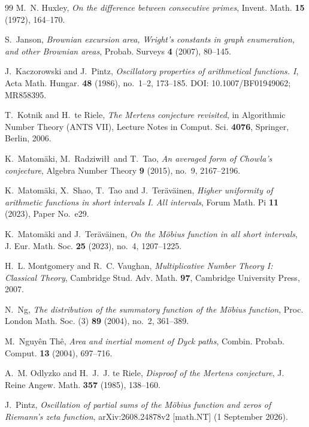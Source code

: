 \documentclass[11pt]{amsart}
\numberwithin{equation}{section}
\theoremstyle{plain}
\theoremstyle{definition}
\theoremstyle{remark}
\begin{document}
\begin{thebibliography}{99}
M.~N. Huxley, \emph{On the difference between consecutive primes}, Invent.
Math. \textbf{15} (1972), 164--170.

S.~Janson, \emph{Brownian excursion area, Wright's constants in graph
enumeration, and other Brownian areas}, Probab. Surveys \textbf{4} (2007),
80--145.

J.~Kaczorowski and J.~Pintz, \emph{Oscillatory properties of arithmetical
functions. I}, Acta Math. Hungar. \textbf{48} (1986), no.~1--2, 173--185.
DOI: 10.1007/BF01949062; MR858395.

T.~Kotnik and H.~te Riele, \emph{The Mertens conjecture revisited}, in
Algorithmic Number Theory (ANTS VII), Lecture Notes in Comput. Sci.
\textbf{4076}, Springer, Berlin, 2006.

K.~Matom\"aki, M.~Radziwi\l\l\ and T.~Tao, \emph{An averaged form of Chowla's
conjecture}, Algebra Number Theory \textbf{9} (2015), no.~9, 2167--2196.

K.~Matom\"aki, X.~Shao, T.~Tao and J.~Ter\"av\"ainen, \emph{Higher uniformity
of arithmetic functions in short intervals I. All intervals}, Forum Math.
Pi \textbf{11} (2023), Paper No.~e29.

K.~Matom\"aki and J.~Ter\"av\"ainen, \emph{On the M\"obius function in all
short intervals}, J. Eur. Math. Soc. \textbf{25} (2023), no.~4, 1207--1225.

H.~L. Montgomery and R.~C. Vaughan, \emph{Multiplicative Number Theory I:
Classical Theory}, Cambridge Stud. Adv. Math. \textbf{97}, Cambridge
University Press, 2007.

N.~Ng, \emph{The distribution of the summatory function of the M\"obius
function}, Proc. London Math. Soc. (3) \textbf{89} (2004), no.~2, 361--389.

M.~Nguy\^en Th\^e, \emph{Area and inertial moment of Dyck paths}, Combin.
Probab. Comput. \textbf{13} (2004), 697--716.

A.~M. Odlyzko and H.~J.~J. te Riele, \emph{Disproof of the Mertens
conjecture}, J. Reine Angew. Math. \textbf{357} (1985), 138--160.

J.~Pintz, \emph{Oscillation of partial sums of the M\"obius function and
zeros of Riemann's zeta function}, arXiv:2608.24878v2 [math.NT] (1 September 2026).


\end{thebibliography}
\end{document}
